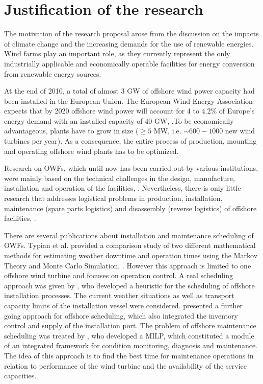 \section{Justification of the research}
The motivation of the research proposal arose from the discussion on the impacts of climate change and the increasing demands for the use of renewable energies. Wind farms play an important role, as they currently represent the only industrially applicable and economically operable facilities for energy conversion from renewable energy sources.

At the end of 2010, a total of almost 3 GW of offshore wind power capacity had been installed in the European Union. The European Wind Energy Association expects that by 2020 offshore wind power will account for 4 to 4.2\% of Europe's energy demand with an installed capacity of 40 GW, \cite{EWEA2011, Kaldellis2013}.To be economically advantageous, plants have to grow in size ($\geq 5$ MW, i.e. $\sim600-1000$ new wind turbines per year). As a consequence, the entire process of production, mounting and operating offshore wind plants has to be optimized.

Research on OWFs, which until now has been carried out by various institutions, were mainly based on the technical challenges in the design, manufacture, installation and operation of the facilities, \cite{Miller2013, SerranoGonzalez2014, Perveen2014}. Nevertheless, there is only little research that addresses logistical problems in production, installation, maintenance (spare parts logistics) and disassembly (reverse logistics) of offshore facilities, \cite{Scholz2010, Lange2012, COMPIT11, COMPIT12, aitsimulation, thalji2012}.

There are several publications about installation and maintenance scheduling of OWFs. Typian et al. provided a comparison study of two different mathematical methods for estimating weather downtime and operation times using the Markov Theory and Monte Carlo Simulation, \cite{Tyapin2011}. However this approach is limited to one offshore wind turbine and focuses on operation control. A real scheduling approach was given by \cite{Scholz2010}, who developed a heuristic for the scheduling of offshore installation processes. The current weather situations as well as transport capacity limits of the installation vessel were considered. \cite{ISOPE2012} presented a further going approach for offshore scheduling, which also integrated the inventory control and supply of the installation port.
The problem of offshore maintenance scheduling was treated by \cite{Kovacs2011497}, who developed a MILP, which constituted a module of an integrated framework for condition monitoring, diagnosis and maintenance. The idea of this approach is to find the best time for maintenance operations in relation to performance of the wind turbine and the availability of the service capacities.

